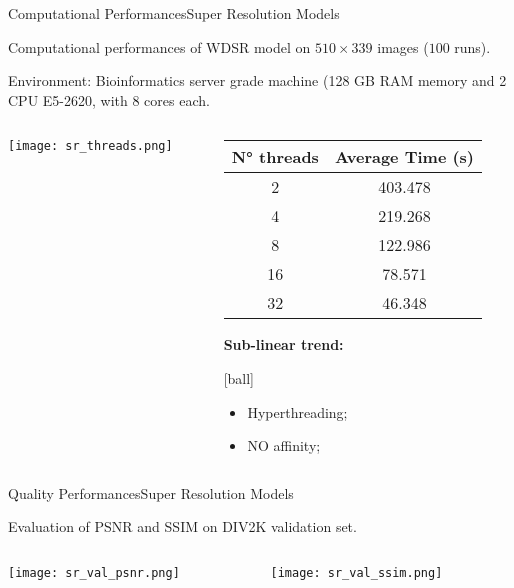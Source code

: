 \documentclass{standalone}
\begin{document}
\begin{frame}{Computational Performances}{Super Resolution Models}

  \scriptsize{Computational performances of WDSR model on $510\times339$ images ($100$ runs).}

  \scriptsize{Environment: Bioinformatics server grade machine (128 GB RAM memory and 2 CPU E5-2620, with 8 cores each.}

  \vfill
  \begin{columns}
    \begin{column}{0.6\textwidth}
      \texttt{[image: sr\_threads.png]}
    \end{column}
    \begin{column}{0.4\textwidth}
      \scriptsize{
      \begin{tabular}{cc}
        \hline \rowcolor{NormalBlue}
        \textbf{N° threads} & \textbf{Average Time (s)} \\
        \hline
         2                  & 403.478                   \\
         4                  & 219.268                   \\
         8                  & 122.986                   \\
        16                  & 78.571                    \\
        32                  & 46.348                    \\
        \hline
      \end{tabular}
      }

      \vspace{0.5cm}
      \scriptsize{\textbf{Sub-linear trend:}}

      [ball]

      \begin{itemize}
        \item \scriptsize{Hyperthreading;}
        \item \scriptsize{NO affinity;}
      \end{itemize}
    \end{column}
  \end{columns}

\end{frame}


\begin{frame}{Quality Performances}{Super Resolution Models}

  \scriptsize{Evaluation of PSNR and SSIM on DIV2K validation set.}

  \begin{columns}
    \begin{column}{0.5\textwidth}
      \texttt{[image: sr\_val\_psnr.png]}
    \end{column}
    \begin{column}{0.5\textwidth}
      \texttt{[image: sr\_val\_ssim.png]}
    \end{column}
  \end{columns}

\end{frame}
\end{document}
